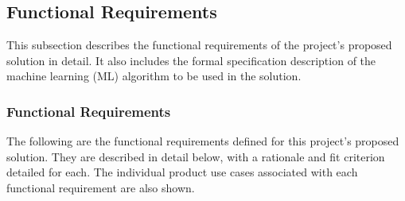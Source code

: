\documentclass[12pt]{article}
\begin{document}
\subsection{Functional Requirements}
This subsection describes the functional requirements of the project's proposed solution in detail.
It also includes the formal specification description of the machine learning (ML) algorithm to be used in the solution.

\subsubsection{Functional Requirements}
The following are the functional requirements defined for this project's proposed solution. They are described in detail below, with a rationale and fit criterion detailed for each. The individual product use cases associated with each functional requirement are also shown.
\end{document}
